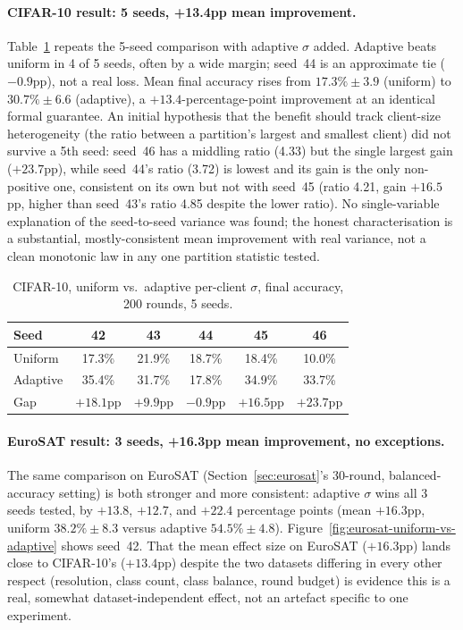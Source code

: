 \documentclass[12pt,a4paper]{article}
\begin{document}
\paragraph{CIFAR-10 result: 5 seeds, +13.4pp mean improvement.} Table~\ref{tab:cifar-adaptive-5seed}
repeats the 5-seed comparison with adaptive $\sigma$ added. Adaptive beats
uniform in 4 of 5 seeds, often by a wide margin; seed~44 is an
approximate tie ($-0.9$pp), not a real loss. Mean final accuracy rises
from $17.3\%\pm3.9$ (uniform) to $30.7\%\pm6.6$ (adaptive), a
$+13.4$-percentage-point improvement at an identical formal guarantee.
An initial hypothesis that the benefit should track client-size
heterogeneity (the ratio between a partition's largest and smallest
client) did not survive a 5th seed: seed~46 has a middling ratio (4.33)
but the single largest gain ($+23.7$pp), while seed~44's ratio (3.72) is
lowest and its gain is the only non-positive one, consistent on its own
but not with seed~45 (ratio 4.21, gain $+16.5$pp, higher than seed~43's
ratio 4.85 despite the lower ratio). No single-variable explanation of
the seed-to-seed variance was found; the honest characterisation is a
substantial, mostly-consistent mean improvement with real variance, not
a clean monotonic law in any one partition statistic tested.

\begin{table}[H]
  \centering
  \caption{CIFAR-10, uniform vs.\ adaptive per-client $\sigma$, final accuracy, 200 rounds, 5 seeds.}
  \label{tab:cifar-adaptive-5seed}
  \begin{tabular}{lccccc}
    \toprule
    Seed & 42 & 43 & 44 & 45 & 46 \\
    \midrule
    Uniform & 17.3\% & 21.9\% & 18.7\% & 18.4\% & 10.0\% \\
    Adaptive & 35.4\% & 31.7\% & 17.8\% & 34.9\% & 33.7\% \\
    Gap & $+18.1$pp & $+9.9$pp & $-0.9$pp & $+16.5$pp & $+23.7$pp \\
    \bottomrule
  \end{tabular}
\end{table}

\paragraph{EuroSAT result: 3 seeds, +16.3pp mean improvement, no exceptions.}
The same comparison on EuroSAT (Section~\ref{sec:eurosat}'s 30-round,
balanced-accuracy setting) is both stronger and more consistent: adaptive
$\sigma$ wins all 3 seeds tested, by $+13.8$, $+12.7$, and $+22.4$
percentage points (mean $+16.3$pp, uniform $38.2\%\pm8.3$ versus adaptive
$54.5\%\pm4.8$). Figure~\ref{fig:eurosat-uniform-vs-adaptive} shows seed~42.
That the mean effect size on EuroSAT ($+16.3$pp) lands close to CIFAR-10's
($+13.4$pp) despite the two datasets differing in every other respect
(resolution, class count, class balance, round budget) is evidence this
is a real, somewhat dataset-independent effect, not an artefact specific
to one experiment.
\end{document}
